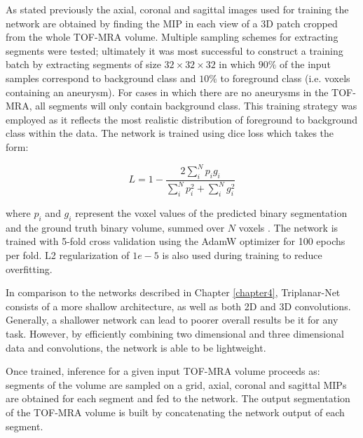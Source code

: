 As stated previously the axial, coronal and sagittal images used for training the network are obtained by finding the MIP in each view of a 3D patch cropped from the whole TOF-MRA volume. Multiple sampling schemes for extracting segments were tested; ultimately it was most successful to construct a training batch by extracting segments of size $32 \times 32 \times 32$ in which $90\%$ of the input samples correspond to background class and $10\%$ to foreground class (i.e. voxels containing an aneurysm). For cases in which there are no aneurysms in the TOF-MRA, all segments will only contain background class. This training strategy was employed as it reflects the most realistic distribution of foreground to background class within the data. The network is trained using dice loss which takes the form: 

\[L = 1 - \frac{2\sum_{i}^{N}p_{i}g_{i}}{\sum_{i}^{N}p_{i}^{2} + \sum_{i}^{N}g_{i}^{2}} \]

where $p_{i}$ and $g_{i}$ represent the voxel values of the predicted binary segmentation and the ground truth binary volume, summed over $N$ voxels \cite{milletari2016v}. The network is trained with 5-fold cross validation using the AdamW optimizer for 100 epochs per fold. L2 regularization of $1e-5$ is also used during training to reduce overfitting.

In comparison to the networks described in Chapter \ref{chapter4}, Triplanar-Net consists of a more shallow architecture, as well as both 2D and 3D convolutions. Generally, a shallower network can lead to poorer overall results be it for any task. However, by efficiently combining two dimensional and three dimensional data and convolutions, the network is able to be lightweight.  

Once trained, inference for a given input TOF-MRA volume proceeds as: segments of the volume are sampled on a grid, axial, coronal and sagittal MIPs are obtained for each segment and fed to the network. The output segmentation of the TOF-MRA volume is built by concatenating the network output of each segment.

